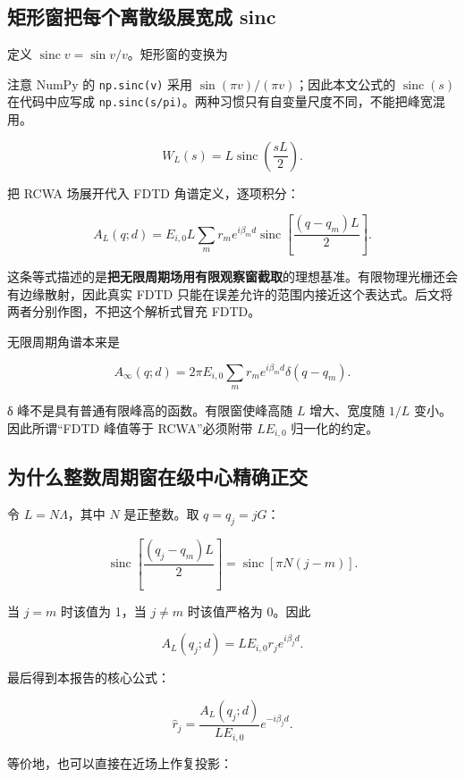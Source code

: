 \documentclass[
  chinese,
  UTF8,
  a4paper,
  11pt]{ctexart}
\begin{document}
\subsection{矩形窗把每个离散级展宽成
sinc}\label{ux77e9ux5f62ux7a97ux628aux6bcfux4e2aux79bbux6563ux7ea7ux5c55ux5bbdux6210-sinc}

定义 \(\operatorname{sinc}v=\sin v/v\)。矩形窗的变换为

注意 NumPy 的 \texttt{np.sinc(v)} 采用
\(\sin(\pi v)/(\pi v)\)；因此本文公式的 \(\operatorname{sinc}(s)\)
在代码中应写成
\texttt{np.sinc(s/pi)}。两种习惯只有自变量尺度不同，不能把峰宽混用。

\[W_L(s)=L\operatorname{sinc}\left(\frac{sL}{2}\right).\]

把 RCWA 场展开代入 FDTD 角谱定义，逐项积分：

\[A_L(q;d)=E_{i,0}L\sum_m r_m e^{i\beta_md}\operatorname{sinc}\left[\frac{(q-q_m)L}{2}\right].\]

这条等式描述的是\textbf{把无限周期场用有限观察窗截取}的理想基准。有限物理光栅还会有边缘散射，因此真实
FDTD
只能在误差允许的范围内接近这个表达式。后文将两者分别作图，不把这个解析式冒充
FDTD。

无限周期角谱本来是

\[A_\infty(q;d)=2\pi E_{i,0}\sum_m r_m e^{i\beta_md}\delta(q-q_m).\]

δ 峰不是具有普通有限峰高的函数。有限窗使峰高随 \(L\) 增大、宽度随
\(1/L\) 变小。因此所谓``FDTD 峰值等于 RCWA''必须附带 \(L E_{i,0}\)
归一化的约定。

\subsection{为什么整数周期窗在级中心精确正交}\label{ux4e3aux4ec0ux4e48ux6574ux6570ux5468ux671fux7a97ux5728ux7ea7ux4e2dux5fc3ux7cbeux786eux6b63ux4ea4}

令 \(L=N\Lambda\)，其中 \(N\) 是正整数。取 \(q=q_j=jG\)：

\[\operatorname{sinc}\left[\frac{(q_j-q_m)L}{2}\right]=\operatorname{sinc}[\pi N(j-m)].\]

当 \(j=m\) 时该值为 1，当 \(j\ne m\) 时该值严格为 0。因此

\[A_L(q_j;d)=L E_{i,0}r_j e^{i\beta_jd}.\]

最后得到本报告的核心公式：

\[\boxed{\displaystyle \widehat r_j=\frac{A_L(q_j;d)}{L E_{i,0}}e^{-i\beta_jd}.}\]

等价地，也可以直接在近场上作复投影：
\end{document}
